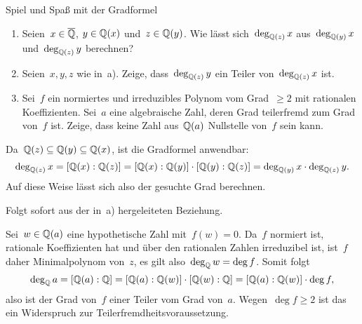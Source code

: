 \documentclass{algblatt}
\begin{document}
\begin{aufgabe}{Spiel und Spaß mit der Gradformel}
\begin{enumerate}
\item Seien~$x \in \overline{\mathbb{Q}}$, $y \in \mathbb{Q}(x)$ und~$z \in \mathbb{Q}(y)$. Wie lässt sich~$\deg_{\mathbb{Q}(z)} x$
aus~$\deg_{\mathbb{Q}(y)} x$ und~$\deg_{\mathbb{Q}(z)} y$ berechnen?

\item Seien~$x, y, z$ wie in~a). Zeige, dass~$\deg_{\mathbb{Q}(z)} y$ ein Teiler
von~$\deg_{\mathbb{Q}(z)} x$ ist.

\item Sei~$f$ ein normiertes und irreduzibles Polynom vom Grad~$\geq 2$ mit rationalen
Koeffizienten. Sei~$a$ eine algebraische Zahl, deren Grad teilerfremd zum Grad
von~$f$ ist. Zeige, dass keine Zahl aus~$\mathbb{Q}(a)$ Nullstelle von~$f$ sein kann.
\end{enumerate}

\begin{loesungE}
\item Da~$\mathbb{Q}(z) \subseteq \mathbb{Q}(y) \subseteq \mathbb{Q}(x)$, ist die Gradformel
anwendbar:
\[ \deg_{\mathbb{Q}(z)} x = [\mathbb{Q}(x):\mathbb{Q}(z)] = [\mathbb{Q}(x):\mathbb{Q}(y)] \cdot
[\mathbb{Q}(y):\mathbb{Q}(z)] = \deg_{\mathbb{Q}(y)} x \cdot \deg_{\mathbb{Q}(z)} y. \]
Auf diese Weise lässt sich also der gesuchte Grad berechnen.

\item Folgt sofort aus der in~a) hergeleiteten Beziehung.

\item Sei~$w \in \mathbb{Q}(a)$ eine hypothetische Zahl mit~$f(w) = 0$. Da~$f$
normiert ist, rationale Koeffizienten hat und über den rationalen Zahlen
irreduzibel ist, ist~$f$ daher Minimalpolynom von~$z$, es gilt also~$\deg_{\mathbb{Q}} w =
\deg f$. Somit folgt
\[ \deg_{\mathbb{Q}} a = [\mathbb{Q}(a):\mathbb{Q}] = [\mathbb{Q}(a):\mathbb{Q}(w)] \cdot [\mathbb{Q}(w):\mathbb{Q}] =
  [\mathbb{Q}(a):\mathbb{Q}(w)] \cdot \deg f, \]
also ist der Grad von~$f$ einer Teiler vom Grad von~$a$. Wegen~$\deg f \geq 2$
ist das ein Widerspruch zur Teilerfremdheitsvoraussetzung.
\end{loesungE}
\end{aufgabe}
\end{document}
